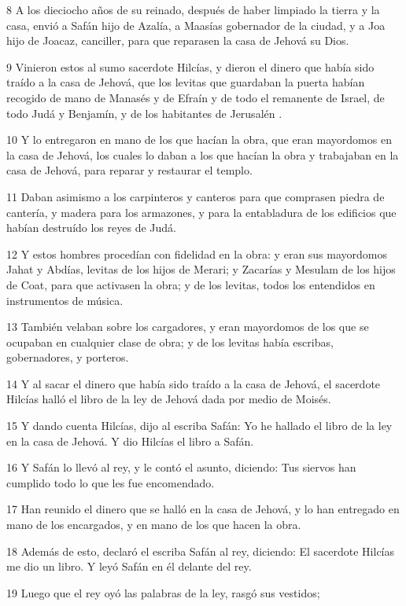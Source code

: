 \par 8 A los dieciocho años de su reinado, después de haber limpiado la tierra y la casa, envió a Safán hijo de Azalía, a Maasías gobernador de la ciudad, y a Joa hijo de Joacaz, canciller, para que reparasen la casa de Jehová su Dios.
\par 9 Vinieron estos al sumo sacerdote Hilcías, y dieron el dinero que había sido traído a la casa de Jehová, que los levitas que guardaban la puerta habían recogido de mano de Manasés y de Efraín y de todo el remanente de Israel, de todo Judá y Benjamín, y de los habitantes de Jerusalén .
\par 10 Y lo entregaron en mano de los que hacían la obra, que eran mayordomos en la casa de Jehová, los cuales lo daban a los que hacían la obra y trabajaban en la casa de Jehová, para reparar y restaurar el templo.
\par 11 Daban asimismo a los carpinteros y canteros para que comprasen piedra de cantería, y madera para los armazones, y para la entabladura de los edificios que habían destruído los reyes de Judá.
\par 12 Y estos hombres procedían con fidelidad en la obra: y eran sus mayordomos Jahat y Abdías, levitas de los hijos de Merari; y Zacarías y Mesulam de los hijos de Coat, para que activasen la obra; y de los levitas, todos los entendidos en instrumentos de música.
\par 13 También velaban sobre los cargadores, y eran mayordomos de los que se ocupaban en cualquier clase de obra; y de los levitas había escribas, gobernadores, y porteros.
\par 14 Y al sacar el dinero que había sido traído a la casa de Jehová, el sacerdote Hilcías halló el libro de la ley de Jehová dada por medio de Moisés.
\par 15 Y dando cuenta Hilcías, dijo al escriba Safán: Yo he hallado el libro de la ley en la casa de Jehová. Y dio Hilcías el libro a Safán.
\par 16 Y Safán lo llevó al rey, y le contó el asunto, diciendo: Tus siervos han cumplido todo lo que les fue encomendado.
\par 17 Han reunido el dinero que se halló en la casa de Jehová, y lo han entregado en mano de los encargados, y en mano de los que hacen la obra.
\par 18 Además de esto, declaró el escriba Safán al rey, diciendo: El sacerdote Hilcías me dio un libro. Y leyó Safán en él delante del rey.
\par 19 Luego que el rey oyó las palabras de la ley, rasgó sus vestidos;
